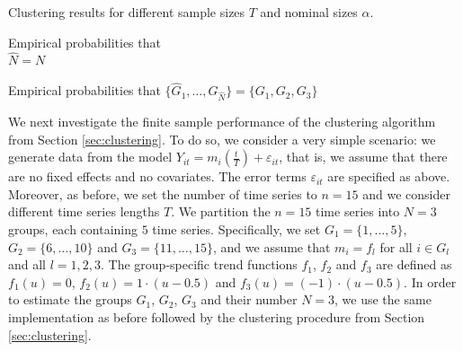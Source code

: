 \documentclass[a4paper,12pt]{article}
\begin{document}
\addtocounter{table}{-1} 
\begin{table}[t]
\footnotesize{
\begin{center}
\caption{Clustering results for different sample sizes $T$ and nominal sizes $\alpha$.}\label{tab:clustering}
\begin{subtable}[b]{0.48\textwidth}
\centering
\caption{Empirical probabilities that \\ $\widehat{N} = N$}\label{tab:clustering:1}
\renewcommand{\arraystretch}{1.2}

\end{subtable}
\begin{subtable}[b]{0.48\textwidth}
\centering
\caption{\centering Empirical probabilities that $\{ \widehat{G}_1,\ldots,\widehat{G}_{\widehat{N}}\} = \{ G_1,G_2,G_3\}$}\label{tab:clustering:2}
\renewcommand{\arraystretch}{1.2}

\end{subtable}
\end{center}}
\vspace{-0.5cm}
\end{table}


We next investigate the finite sample performance of the clustering algorithm from Section \ref{sec:clustering}. To do so, we consider a very simple scenario: we generate data from the model $Y_{it} = m_i(\frac{t}{T}) + \varepsilon_{it}$, that is, we assume that there are no fixed effects and no covariates. The error terms $\varepsilon_{it}$ are specified as above. Moreover, as before, we set the number of time series to $n = 15$ and we consider different time series lengths $T$. We partition the $n = 15$ time series into $N=3$ groups, each containing $5$ time series. Specifically, we set $G_1 = \{1,\ldots, 5\}$, $G_2 = \{6,\ldots, 10\}$ and $G_3 =  \{11,\ldots, 15\}$, and we assume that $m_i = f_l$ for all $i \in G_l$ and all $l = 1, 2, 3$. The group-specific trend functions $f_1$, $f_2$ and $f_3$ are defined as $f_1(u) = 0$, $f_2(u) = 1 \cdot (u - 0.5)$ and $f_3(u) =  (- 1) \cdot (u - 0.5)$. In order to estimate the groups $G_1$, $G_2$, $G_3$ and their number $N = 3$, we use the same implementation as before followed by the clustering procedure from Section \ref{sec:clustering}. 
\end{document}
